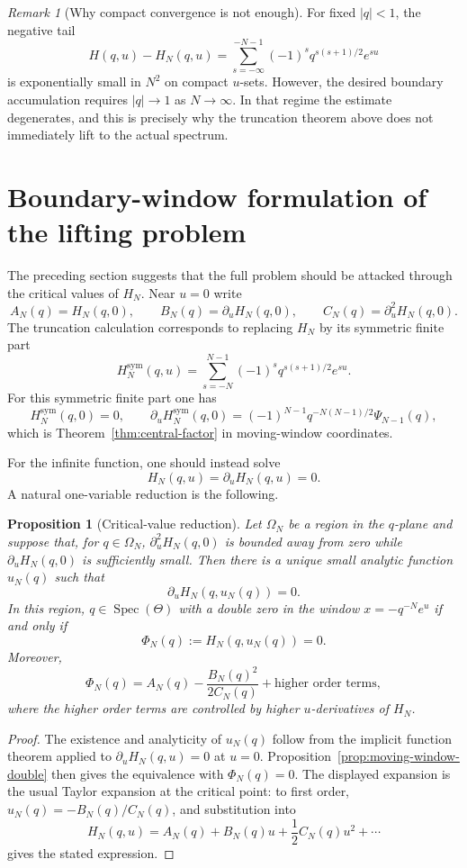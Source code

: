\documentclass[11pt,a4paper,reqno]{amsart}
\newtheorem{proposition}[theorem]{Proposition}
\theoremstyle{remark}
\newtheorem{remark}[theorem]{Remark}
\newcommand{\Spec}{\operatorname{Spec}}
\begin{document}
\begin{remark}[Why compact convergence is not enough]
For fixed \(|q|<1\), the negative tail
\[
        H(q,u)-H_N(q,u)=\sum_{s=-\infty}^{-N-1}(-1)^s q^{s(s+1)/2}e^{su}
\]
is exponentially small in \(N^2\) on compact \(u\)-sets.  However, the desired boundary accumulation requires \(|q|\to1\) as \(N\to\infty\).  In that regime the estimate degenerates, and this is precisely why the truncation theorem above does not immediately lift to the actual spectrum.
\end{remark}

\section{Boundary-window formulation of the lifting problem}
The preceding section suggests that the full problem should be attacked through the critical values of \(H_N\).  Near \(u=0\) write
\[
        A_N(q)=H_N(q,0),\qquad
        B_N(q)=\partial_uH_N(q,0),\qquad
        C_N(q)=\partial_u^2H_N(q,0).
\]
The truncation calculation corresponds to replacing \(H_N\) by its symmetric finite part
\[
        H_N^{\mathrm{sym}}(q,u)=\sum_{s=-N}^{N-1}(-1)^sq^{s(s+1)/2}e^{su}.
\]
For this symmetric finite part one has
\[
        H_N^{\mathrm{sym}}(q,0)=0,
        \qquad
        \partial_uH_N^{\mathrm{sym}}(q,0)=(-1)^{N-1}q^{-N(N-1)/2}\Psi_{N-1}(q),
\]
which is Theorem~\ref{thm:central-factor} in moving-window coordinates.

For the infinite function, one should instead solve
\[
        H_N(q,u)=\partial_uH_N(q,u)=0.
\]
A natural one-variable reduction is the following.

\begin{proposition}[Critical-value reduction]\label{prop:critical-value-reduction}
Let \(\Omega_N\) be a region in the \(q\)-plane and suppose that, for \(q\in\Omega_N\), \(\partial_u^2H_N(q,0)\) is bounded away from zero while \(\partial_uH_N(q,0)\) is sufficiently small.  Then there is a unique small analytic function \(u_N(q)\) such that
\[
        \partial_uH_N(q,u_N(q))=0.
\]
In this region, \(q\in\Spec(\Theta)\) with a double zero in the window \(x=-q^{-N}e^u\) if and only if
\[
        \Phi_N(q):=H_N(q,u_N(q))=0.
\]
Moreover,
\[
        \Phi_N(q)=A_N(q)-\frac{B_N(q)^2}{2C_N(q)}+\text{higher order terms},
\]
where the higher order terms are controlled by higher \(u\)-derivatives of \(H_N\).
\end{proposition}

\begin{proof}
The existence and analyticity of \(u_N(q)\) follow from the implicit function theorem applied to \(\partial_uH_N(q,u)=0\) at \(u=0\).  Proposition~\ref{prop:moving-window-double} then gives the equivalence with \(\Phi_N(q)=0\).  The displayed expansion is the usual Taylor expansion at the critical point: to first order, \(u_N(q)=-B_N(q)/C_N(q)\), and substitution into
\[
        H_N(q,u)=A_N(q)+B_N(q)u+\frac12C_N(q)u^2+\cdots
\]
gives the stated expression.
\end{proof}
\end{document}
